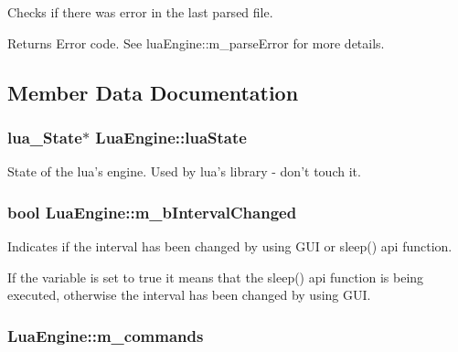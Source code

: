Checks if there was error in the last parsed file. 

\begin{DoxyReturn}{Returns}
Error code. See lua\-Engine\-::m\-\_\-parse\-Error for more details. 
\end{DoxyReturn}


\subsection{Member Data Documentation}
\hypertarget{class_lua_engine_af9593e71b3d33a62cbf9e3080771bff9}{
\subsubsection[{lua\-State}]{\setlength{\rightskip}{0pt plus 5cm}lua\-\_\-\-State$\ast$ Lua\-Engine\-::lua\-State\hspace{0.3cm}{\ttfamily [private]}}}\label{class_lua_engine_af9593e71b3d33a62cbf9e3080771bff9}


State of the lua's engine. Used by lua's library -\/ don't touch it. 

\hypertarget{class_lua_engine_add74083d158ee3543d0644c0b6349c5d}{
\subsubsection[{m\-\_\-b\-Interval\-Changed}]{\setlength{\rightskip}{0pt plus 5cm}bool Lua\-Engine\-::m\-\_\-b\-Interval\-Changed\hspace{0.3cm}{\ttfamily [private]}}}\label{class_lua_engine_add74083d158ee3543d0644c0b6349c5d}


Indicates if the interval has been changed by using G\-U\-I or sleep() api function. 

If the variable is set to true it means that the sleep() api function is being executed, otherwise the interval has been changed by using G\-U\-I. \hypertarget{class_lua_engine_a86a3f32127e36e1ccce6c5a42a298ad5}{
\subsubsection[{m\-\_\-commands}]{ Lua\-Engine\-::m\-\_\-commands\hspace{0.3cm}{\ttfamily [private]}}}\label{class_lua_engine_a86a3f32127e36e1ccce6c5a42a298ad5}


